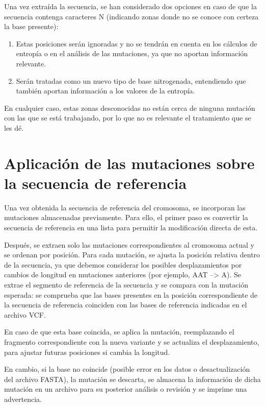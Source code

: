 \documentclass[11pt,spanish,listoffigures,listoftables]{tfgetsinf}
\begin{document}
Una vez extraída la secuencia, se han considerado dos opciones en caso de que la secuencia contenga caracteres N (indicando zonas donde no se conoce con certeza la base presente): 

\begin{enumerate}
  \item Estas posiciones serán ignoradas y no se tendrán en cuenta en los cálculos de entropía o en el análisis de las mutaciones, ya que no aportan información relevante.
  \item Serán tratadas como un nuevo tipo de base nitrogenada, entendiendo que también aportan información a los valores de la entropía.
\end{enumerate}

En cualquier caso, estas zonas desconocidas no están cerca de ninguna mutación con las que se está trabajando, por lo que no es relevante el tratamiento que se les dé. 

\section{Aplicación de las mutaciones sobre la secuencia de referencia}

Una vez obtenida la secuencia de referencia del cromosoma, se incorporan las mutaciones almacenadas previamente. Para ello, el primer paso es convertir la secuencia de referencia en una lista para permitir la modificación directa de esta. 

Después, se extraen solo las mutaciones correspondientes al cromosoma actual y se ordenan por posición. Para cada mutación, se ajusta la posición relativa dentro de la secuencia, ya que debemos considerar los posibles desplazamientos por cambios de longitud en mutaciones anteriores (por ejemplo, AAT --> A). Se extrae el segmento de referencia de la secuencia y se compara con la mutación esperada: se comprueba que las bases presentes en la posición correspondiente de la secuencia de referencia coinciden con las bases de referencia indicadas en el archivo \ac{VCF}. 

En caso de que esta base coincida, se aplica la mutación, reemplazando el fragmento correspondiente con la nueva variante y se actualiza el desplazamiento, para ajustar futuras posiciones si cambia la longitud. 

En cambio, si la base no coincide (posible error en los datos o desactualización del archivo \ac{FASTA}), la mutación se descarta, se almacena la información de dicha mutación en un archivo para su posterior análisis o revisión y se imprime una advertencia. 
\end{document}
